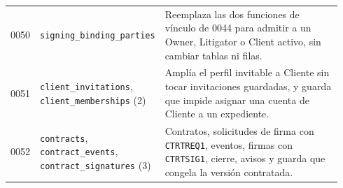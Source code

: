 \begin{longtable}{@{}C{0.06\linewidth}L{0.29\linewidth}L{0.59\linewidth}@{}}
  0050 & \texttt{signing\_binding\_parties} & Reemplaza las dos funciones de vínculo de 0044 para admitir a un Owner, Litigator o Client activo, sin cambiar tablas ni filas. \\
  0051 & \texttt{client\_invitations}, \texttt{client\_memberships} (2) & Amplía el perfil invitable a Cliente sin tocar invitaciones guardadas, y guarda que impide asignar una cuenta de Cliente a un expediente. \\
  0052 & \texttt{contracts}, \texttt{contract\_events}, \texttt{contract\_signatures} (3) & Contratos, solicitudes de firma con \texttt{CTRTREQ1}, eventos, firmas con \texttt{CTRTSIG1}, cierre, avisos y guarda que congela la versión contratada. \\
\end{longtable}
\endgroup
